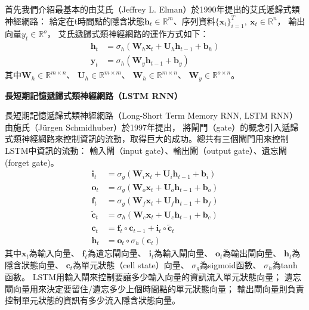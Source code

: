 首先我們介紹最基本的由艾氏（Jeffrey L. Elman）於1990年提出的艾氏遞歸式類神經網路\cite{elman1990finding}：
給定在t時間點的隱含狀態$\mathbf{h}_{t} \in \mathbb{R}^{m}$、序列資料$\{\mathbf{x}_i\}_{i=1}^{T},\ \mathbf{x}_t \in \mathbb{R}^{n}$，
輸出向量$y_{t} \in \mathbb{R}^{o}$，
艾氏遞歸式類神經網路的運作方式如下：
\begin{equation}
    \begin{split}
    \mathbf{h}_{t} &= \sigma_{h} \left( \mathbf{W}_{h} \mathbf{x}_{t} + \mathbf{U}_{h} \mathbf{h}_{t-1} + \mathbf{b}_h \right) \\
    \mathbf{y}_{t} &= \sigma_{h} \left( \mathbf{W}_{y} \mathbf{h}_{t-1} + \mathbf{b}_y \right)
    \end{split}
\end{equation}
其中$\mathbf{W}_{h} \in \mathbb{R}^{m \times n}$、
$\mathbf{U}_{h} \in \mathbb{R}^{m \times m}$、
$\mathbf{W}_{h} \in \mathbb{R}^{m \times n}$、
$\mathbf{W}_{y} \in \mathbb{R}^{o \times n}$。

\vspace{12pt}
\noindent\textbf{長短期記憶遞歸式類神經網路（LSTM RNN）}
\vspace{4pt}

長短期記憶遞歸式類神經網路（Long-Short Term Memory RNN, LSTM RNN）由施氏（Jürgen Schmidhuber）\cite{hochreiter1997long}於1997年提出，
將閘門（gate）的概念引入遞歸式類神經網路來控制資訊的流動，取得巨大的成功。總共有三個閘門用來控制LSTM中資訊的流動：
輸入閘（input gate）、輸出閘（output gate）、遺忘閘(forget gate)。
\begin{subequations}
    \begin{align}
    \mathbf{i}_t &= \sigma_{g} \left( \mathbf{W}_i \mathbf{x}_t + \mathbf{U}_i \mathbf{h}_{t-1} + \mathbf{b}_i \right) \\
    \mathbf{o}_t &= \sigma_{g} \left( \mathbf{W}_o \mathbf{x}_t + \mathbf{U}_o \mathbf{h}_{t-1} + \mathbf{b}_o \right) \\
    \mathbf{f}_t &= \sigma_{g} \left( \mathbf{W}_f \mathbf{x}_t + \mathbf{U}_f \mathbf{h}_{t-1} + \mathbf{b}_f \right) \\
    \mathbf{\tilde{c}}_{t} &= \sigma_{h} \left( \mathbf{W}_c \mathbf{x}_t + \mathbf{U}_c \mathbf{h}_{t-1} + \mathbf{b}_c \right) \\
    \mathbf{c}_{t} &= \mathbf{f}_t \circ \mathbf{c}_{t-1} + \mathbf{i}_t \circ \mathbf{\tilde{c}}_t \\
    \mathbf{h}_t &= \mathbf{o}_t \circ \sigma_{h} (\mathbf{c}_t)
    \end{align}
\end{subequations}
其中$\mathbf{x}_t$為輸入向量、
$\mathbf{f}_t$為遺忘閘向量、
$\mathbf{i}_t$為輸入閘向量、
$\mathbf{o}_t$為輸出閘向量、
$\mathbf{h}_t$為隱含狀態向量、
$\mathbf{c}_t$為單元狀態（cell state）向量、
$\sigma_{g}$為sigmoid函數、
$\sigma_{h}$為tanh函數。
LSTM用輸入閘來控制要讓多少輸入向量的資訊流入單元狀態向量；
遺忘閘向量用來決定要留住/遺忘多少上個時間點的單元狀態向量；
輸出閘向量則負責控制單元狀態的資訊有多少流入隱含狀態向量。
